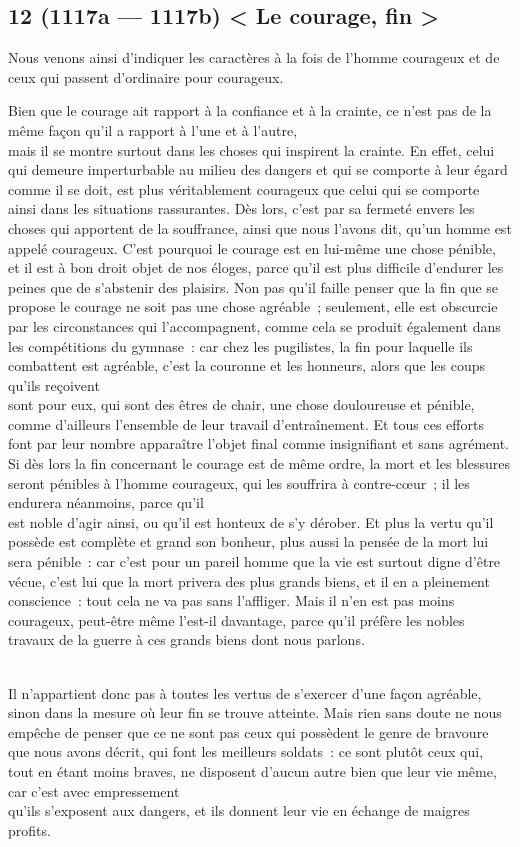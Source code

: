 \documentclass[french,twoside]{book} %
\begin{document}
\subsection[{12 (1117a — 1117b) < Le courage, fin >}]{12 (1117a — 1117b) < Le courage, fin >}
\noindent Nous venons ainsi d’indiquer les caractères à la fois de l’homme courageux et de ceux qui passent d’ordinaire pour courageux.\par
Bien que le courage ait rapport à la confiance et à la crainte, ce n’est pas de la même façon qu’il a rapport à l’une et à l’autre, \\
mais il se montre surtout dans les choses qui inspirent la crainte. En effet, celui qui demeure imperturbable au milieu des dangers et qui se comporte à leur égard comme il se doit, est plus véritablement courageux que celui qui se comporte ainsi dans les situations rassurantes. Dès lors, c’est par sa fermeté envers les choses qui apportent de la souffrance, ainsi que nous l’avons dit, qu’un homme est appelé courageux. C’est pourquoi le courage est en lui-même une chose pénible, \\
et il est à bon droit objet de nos éloges, parce qu’il est plus difficile d’endurer les peines que de s’abstenir des plaisirs.  Non pas qu’il faille penser que la fin que se propose le courage ne soit pas une chose agréable ; seulement, elle est obscurcie par les circonstances qui l’accompagnent, comme cela se produit également dans les compétitions du gymnase : car chez les pugilistes, la fin pour laquelle ils combattent est agréable, c’est la couronne et les honneurs, alors que les coups qu’ils reçoivent \\
sont pour eux, qui sont des êtres de chair, une chose douloureuse et pénible, comme d’ailleurs l’ensemble de leur travail d’entraînement. Et tous ces efforts font par leur nombre apparaître l’objet final comme insignifiant et sans agrément. Si dès lors la fin concernant le courage est de même ordre, la mort et les blessures seront pénibles à l’homme courageux, qui les souffrira à contre-cœur ; il les endurera néanmoins, parce qu’il \\
est noble d’agir ainsi, ou qu’il est honteux de s’y dérober. Et plus la vertu qu’il possède est complète et grand son bonheur, plus aussi la pensée de la mort lui sera pénible : car c’est pour un pareil homme que la vie est surtout digne d’être vécue, c’est lui que la mort privera des plus grands biens, et il en a pleinement conscience : tout cela ne va pas sans l’affliger. Mais il n’en est pas moins courageux, peut-être même l’est-il davantage, parce qu’il préfère les nobles travaux de la guerre à ces grands biens dont nous parlons.\par
\\
Il n’appartient donc pas à toutes les vertus de s’exercer d’une façon agréable, sinon dans la mesure où leur fin se trouve atteinte. Mais rien sans doute ne nous empêche de penser que ce ne sont pas ceux qui possèdent le genre de bravoure que nous avons décrit, qui font les meilleurs soldats : ce sont plutôt ceux qui, tout en étant moins braves, ne disposent d’aucun autre bien que leur vie même, car c’est avec empressement \\
qu’ils s’exposent aux dangers, et ils donnent leur vie en échange de maigres profits.
\end{document}
